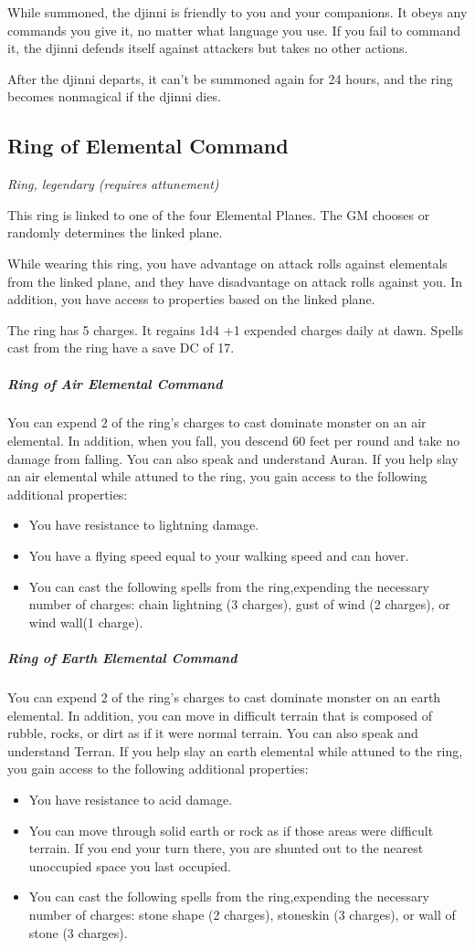 While summoned, the djinni is friendly to you and your companions. It obeys any commands you give it, no matter what language you use. If you fail to command it, the djinni defends itself against attackers but takes no other actions.

After the djinni departs, it can't be summoned again for 24 hours, and the ring becomes nonmagical if the djinni dies.

\subsection{Ring of Elemental Command}
\textit{Ring, legendary (requires attunement)}

This ring is linked to one of the four Elemental Planes. The GM chooses or randomly determines the linked plane.

While wearing this ring, you have advantage on attack rolls against elementals from the linked plane, and they have disadvantage on attack rolls against you. In addition, you have access to properties based on the linked plane.

The ring has 5 charges. It regains 1d4 +1 expended charges daily at dawn. Spells cast from the ring have a save DC of 17.

\subparagraph*{Ring of Air Elemental Command} You can expend 2 of the ring's charges to cast dominate monster on an air elemental. In addition, when you fall, you descend 60 feet per round and take no damage from falling. You can also speak and understand Auran.
If you help slay an air elemental while attuned to the ring, you gain access to the following additional properties:
\begin{itemize}
\item You have resistance to lightning damage.
\item You have a flying speed equal to your walking speed and can hover.
\item You can cast the following spells from the ring,expending the necessary number of charges: chain lightning (3 charges), gust of wind (2 charges), or wind wall(1 charge).
\end{itemize}

\subparagraph*{Ring of Earth Elemental Command} You can expend 2 of the ring's charges to cast dominate monster on an earth elemental. In addition, you can move in difficult terrain that is composed of rubble, rocks, or dirt as if it were normal terrain. You can also speak and understand Terran.  If you help slay an earth elemental while attuned to the ring, you gain access to the following additional properties:
\begin{itemize}
\item You have resistance to acid damage.
\item You can move through solid earth or rock as if those areas were difficult terrain. If you end your turn there, you are shunted out to the nearest unoccupied space you last occupied.
\item You can cast the following spells from the ring,expending the necessary number of charges: stone shape (2 charges), stoneskin (3 charges), or wall of stone (3 charges).
\end{itemize}

